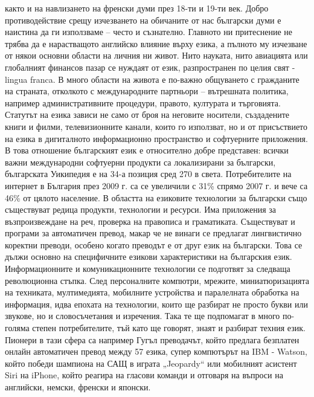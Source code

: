\begin{multicols}{2}
както и на навлизането на френски думи през 18-ти и 19-ти век. Добро противодействие срещу изчезването на обичаните от нас български думи е наистина да ги използваме – често и съзнателно.  Главното ни притеснение не трябва да е нарастващото английско влияние върху езика, а пълното му изчезване от някои основни области на личния ни живот. Нито науката, нито авиацията или глобалният финансов пазар се нуждаят от език, разпространен по целия свят - lingua franca. В много области на живота е по-важно общуването с гражданите на страната, отколкото с международните партньори – вътрешната политика, например административните процедури, правото, културата и търговията. Статутът на езика зависи не само от броя на неговите носители, създадените книги и филми, телевизионните канали, които го използват, но и от присъствието на езика в дигиталното информационно пространство и софтуерните приложения.  В това отношение българският език е относително добре представен: всички важни международни софтуерни продукти са локализирани за български, българската Уикипедия е на 34-а позиция сред 270 в света. Потребителите на интернет в България през 2009 г. са се увеличили с 31\% спрямо 2007 г. и вече са 46\% от цялото население.  В областта на езиковите технологии за български също съществуват редица продукти, технологии и ресурси. Има приложения за възпроизвеждане на реч, проверка на правописа и граматиката. Съществуват и програми за автоматичен превод, макар че не винаги се предлагат лингвистично коректни преводи, особено когато преводът е от друг език на български. Това се дължи основно на специфичните езикови характеристики на българския език.  Информационните и комуникационните технологии се подготвят за следваща революционна стъпка. След персоналните компютри, мрежите, миниатюризацията на техниката, мултимедията, мобилните устройства и паралелната обработка на информация, идва епохата на технологии, които ще разбират не просто букви или звукове, но и словосъчетания и изречения. Така те ще подпомагат в много по-голяма степен потребителите, тъй като ще говорят, знаят и разбират техния език. Пионери в тази сфера са например Гугъл преводачът, който предлага безплатен онлайн автоматичен превод между 57 езика, супер компютърът на IBM - Watson, който победи шампиона на САЩ в играта „Jeopardy“ или мобилният асистент Siri на iPhone, който реагира на гласови команди и отговаря на въпроси на английски, немски, френски и японски.


\end{multicols}
